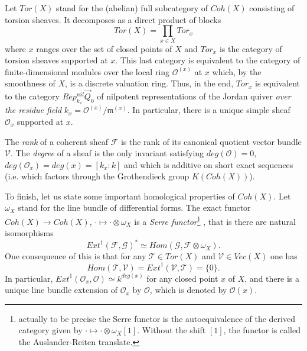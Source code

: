 \documentclass[a4paper,10pt]{amsart}
\numberwithin{equation}{section}
\begin{document}
\vspace{.1in}

Let ${T}or(X)$ stand for the (abelian) full subcategory of $Coh(X)$ consisting of torsion sheaves. It decomposes as a direct product of blocks
$${T}or(X)=\prod_{x \in X} {T}or_x$$
where $x$ ranges over the set of closed points of $X$ and ${T}or_x$ is the category of torsion sheaves supported at $x$. This last category is equivalent to the category of finite-dimensional modules over the local ring $\mathcal{O}^{(x)}$ at $x$ which, by the smoothness of $X$, is a discrete valuation ring. Thus, in the end, ${T}or_x$ is equivalent to the category $Rep^{nil}_{k_x}\vec{Q}_0$ of nilpotent representations of the Jordan quiver \textit{over the residue field} $k_x=\mathcal{O}^{(x)}/\mathfrak{m}^{(x)}$. In particular, there is a unique simple sheaf $\mathcal{O}_x$ supported at $x$.

\vspace{.1in}

The \textit{rank} of a coherent sheaf $\mathcal{F}$ is the rank of its canonical quotient vector bundle $\mathcal{V}$. The \textit{degree} of a sheaf is the only invariant satisfying $deg(\mathcal{O})=0$, $deg(\mathcal{O}_x)=deg(x)=[k_x:k]$ and which is additive on short exact sequences (i.e. which factors through the Grothendieck group $K(Coh(X))$).

\vspace{.1in}

To finish, let us state some important homological properties of $Coh(X)$. Let $\omega_X$ stand for the line bundle of differential forms. The exact functor $Coh(X) \to Coh(X)$,\; $\cdot \mapsto \cdot \otimes \omega_X$ is a \textit{Serre functor}\footnote{actually to be precise the Serre functor is the autoequivalence of the derived category given by $\cdot \mapsto \cdot \otimes \omega_X[1]$. Without the shift $[1]$, the functor is called the Auslander-Reiten translate.}
, that is there are natural isomorphisms
\begin{equation}\label{E:Serreduality}
{Ext}^1(\mathcal{F},\mathcal{G})^* \simeq {Hom}(\mathcal{G}, \mathcal{F}\otimes \omega_X).
\end{equation}
One consequence of this is that for any $\mathcal{T} \in {T}or(X)$ and $\mathcal{V} \in Vec(X)$ one has
\begin{equation}\label{E:homtorvec}
{Hom}(\mathcal{T},\mathcal{V}) ={Ext}^1(\mathcal{V},\mathcal{T})=\{0\}.
\end{equation}
In particular, ${Ext}^1(\mathcal{O}_x,\mathcal{O})\simeq k^{deg(x)}$ for any closed point $x$ of $X$, and there is a unique line bundle extension of $\mathcal{O}_x$ by $\mathcal{O}$, which is denoted by $\mathcal{O}(x)$.
\end{document}
